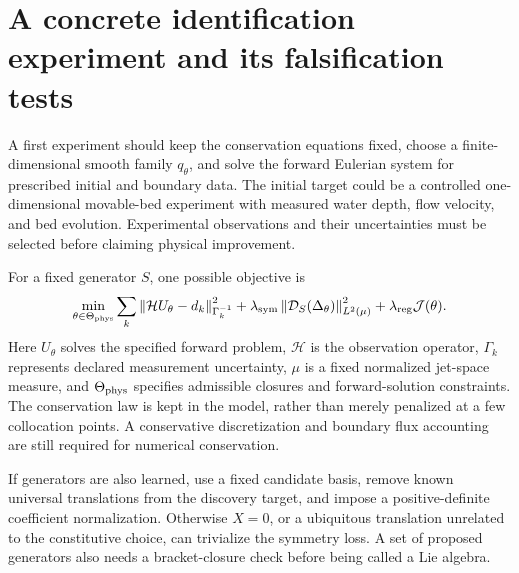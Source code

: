 \documentclass[11pt,a4paper,oneside]{report}
\numberwithin{equation}{chapter}
\newcommand{\norm}[1]{\left\lVert#1\right\rVert}
\begin{document}
\section{A concrete identification experiment and its falsification tests}
A first experiment should keep the conservation equations fixed, choose a finite-dimensional smooth family $q_\theta$, and solve the forward Eulerian system for prescribed initial and boundary data. The initial target could be a controlled one-dimensional movable-bed experiment with measured water depth, flow velocity, and bed evolution. Experimental observations and their uncertainties must be selected before claiming physical improvement.

For a fixed generator $S$, one possible objective is
\begin{equation}\label{eq:objective}
\min_{\theta\in\Theta_{\rm phys}}
\sum_{k}\norm{\mathcal H U_\theta-d_k}_{\Gamma_k^{-1}}^2
+\lambda_{\rm sym}\norm{\mathcal D_S(\Delta_\theta)}_{L^2(\mu)}^2
+\lambda_{\rm reg}\mathcal J(\theta).
\end{equation}
Here $U_\theta$ solves the specified forward problem, $\mathcal H$ is the observation operator, $\Gamma_k$ represents declared measurement uncertainty, $\mu$ is a fixed normalized jet-space measure, and $\Theta_{\rm phys}$ specifies admissible closures and forward-solution constraints. The conservation law is kept in the model, rather than merely penalized at a few collocation points. A conservative discretization and boundary flux accounting are still required for numerical conservation.

If generators are also learned, use a fixed candidate basis, remove known universal translations from the discovery target, and impose a positive-definite coefficient normalization. Otherwise $X=0$, or a ubiquitous translation unrelated to the constitutive choice, can trivialize the symmetry loss. A set of proposed generators also needs a bracket-closure check before being called a Lie algebra.
\end{document}
